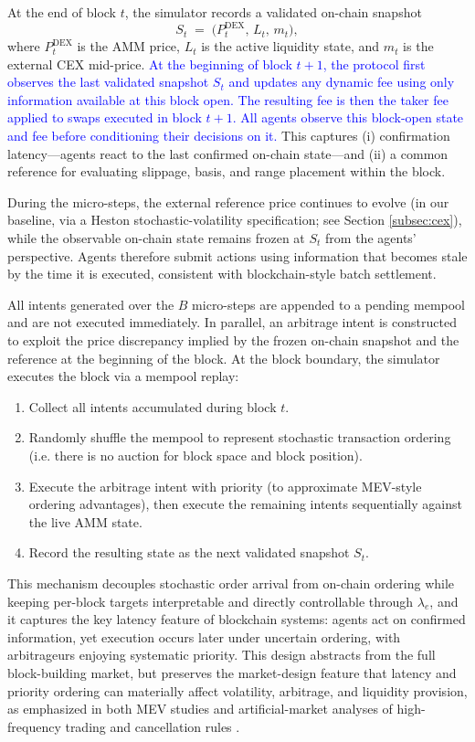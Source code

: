 \documentclass[11pt]{article}
\begin{document}
At the end of block $t$, the simulator records a validated on-chain snapshot
\[
  S_t \;=\; \bigl(P_t^{\mathrm{DEX}},\, L_t,\, m_t\bigr),
\]
where $P_t^{\mathrm{DEX}}$ is the AMM price, $L_t$ is the active liquidity state, and
$m_t$ is the external CEX mid-price. \textcolor{blue}{At the beginning of block $t+1$, the protocol first observes the last validated snapshot $S_t$ and updates any dynamic fee using only information available at this block open. The resulting fee is then the taker fee applied to swaps executed in block $t+1$. All agents observe this block-open state and fee before conditioning their decisions on it.}
This captures (i) confirmation latency—agents react to the last confirmed on-chain
state—and (ii) a common reference for evaluating slippage, basis, and range placement
within the block.


During the micro-steps, the external reference price continues to
evolve (in our baseline, via a Heston stochastic-volatility specification; see
Section \ref{subsec:cex}), while the observable on-chain state remains frozen
at $S_{t}$ from the agents' perspective. Agents therefore submit actions using
information that becomes stale by the time it is executed, consistent with
blockchain-style batch settlement.


All intents generated over the $B$ micro-steps are appended to a pending mempool and
are not executed immediately. In parallel, an arbitrage intent is constructed
to exploit the price discrepancy implied by the frozen on-chain snapshot and the
reference  at the beginning of the block. At the block boundary, the simulator executes the block via
a mempool replay:
\begin{enumerate}[leftmargin=*]
  \item Collect all intents accumulated during block $t$.
  \item Randomly shuffle the mempool to represent stochastic transaction ordering (i.e. there is no auction for block space and block position).
  \item Execute the arbitrage intent with priority (to approximate MEV-style
        ordering advantages), then execute the remaining intents sequentially against
        the live AMM state.
  \item Record the resulting state as the next validated snapshot $S_t$.
\end{enumerate}
This mechanism decouples stochastic order arrival from on-chain ordering while keeping
per-block targets interpretable and directly controllable through $\lambda_e$, and it
captures the key latency feature of blockchain systems: agents act on confirmed
information, yet execution occurs later under uncertain ordering, with arbitrageurs
enjoying systematic priority. This design abstracts from the full block-building market, but preserves the market-design feature that latency and priority ordering can materially affect volatility, arbitrage, and liquidity provision, as emphasized in both MEV studies and artificial-market analyses of high-frequency trading and cancellation rules \cite{flashboys,leal2016,gao2024,yagi2020}.
\end{document}
